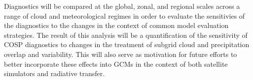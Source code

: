 \documentclass[letter]{article}
\begin{document}
Diagnostics will be compared at the global, zonal, and regional scales across a range of cloud and meteorological regimes in order to evaluate the sensitivies of the diagnostics to the changes in the context of common model evaluation strategies. The result of this analysis will be a quantification of the sensitivity of COSP diagnostics to changes in the treatment of subgrid cloud and precipitation overlap and variability. This will also serve as motivation for future efforts to better incorporate these effects into GCMs in the context of both satellite simulators and radiative transfer.





\end{document}
